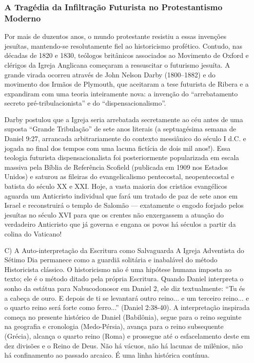 \documentclass[11pt,a4paper,openany]{book}
\begin{document}
\subsubsection*{A Tragédia da Infiltração Futurista no Protestantismo Moderno}
Por mais de duzentos anos, o mundo protestante resistiu a essas invenções jesuítas, mantendo-se resolutamente fiel ao historicismo profético. Contudo, nas décadas de 1820 e 1830, teólogos britânicos associados ao Movimento de Oxford e clérigos da Igreja Anglicana começaram a ressuscitar o futurismo jesuíta. A grande virada ocorreu através de John Nelson Darby (1800–1882) e do movimento dos Irmãos de Plymouth, que aceitaram a tese futurista de Ribera e a expandiram com uma teoria inteiramente nova: a invenção do ``arrebatamento secreto pré-tribulacionista'' e do ``dispensacionalismo''.

Darby postulou que a Igreja seria arrebatada secretamente ao céu antes de uma suposta ``Grande Tribulação'' de sete anos literais (a septuagésima semana de Daniel 9:27, arrancada arbitrariamente do contexto messiânico do século I d.C. e jogada no final dos tempos com uma lacuna fictícia de dois mil anos!). Essa teologia futurista dispensacionalista foi posteriormente popularizada em escala massiva pela Bíblia de Referência Scofield (publicada em 1909 nos Estados Unidos) e saturou as fileiras do evangelicalismo pentecostal, neopentecostal e batista do século XX e XXI. Hoje, a vasta maioria dos cristãos evangélicos aguarda um Anticristo individual que fará um tratado de paz de sete anos em Israel e reconstruirá o templo de Salomão — exatamente o engodo forjado pelos jesuítas no século XVI para que os crentes não enxergassem a atuação do verdadeiro Anticristo que já governa e engana os povos há séculos a partir da colina do Vaticano!

C) A Auto-interpretação da Escritura como Salvaguarda
A Igreja Adventista do Sétimo Dia permanece como a guardiã solitária e inabalável do método Historicista clássico. O historicismo não é uma hipótese humana imposta ao texto; ele é o método ditado pela própria Escritura. Quando Daniel interpreta o sonho da estátua para Nabucodonosor em Daniel 2, ele diz textualmente: ``Tu és a cabeça de ouro. E depois de ti se levantará outro reino... e um terceiro reino... e o quarto reino será forte como ferro...'' (Daniel 2:38-40). A interpretação inspirada começa no presente histórico de Daniel (Babilônia), segue para o reino seguinte na geografia e cronologia (Medo-Pérsia), avança para o reino subsequente (Grécia), alcança o quarto reino (Roma) e prossegue até o esfacelamento deste em dez divisões e o Reino de Deus. Não há vácuos, não há lacunas de milênios, não há confinamento ao passado arcaico. É uma linha histórica contínua.
\end{document}
